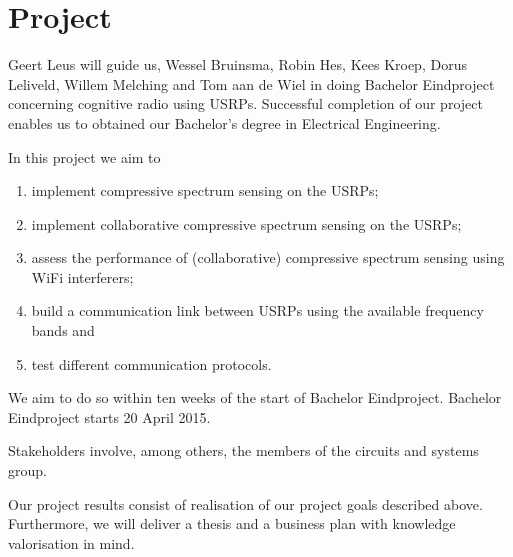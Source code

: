 \documentclass{memoir}
\begin{document}
\chapter{Project}
Geert Leus will guide us, Wessel Bruinsma, Robin Hes, Kees Kroep, Dorus Leliveld, Willem Melching and Tom aan de Wiel in doing Bachelor Eindproject concerning cognitive radio using USRPs. Successful completion of our project enables us to obtained our Bachelor's degree in Electrical Engineering.

In this project we aim to
\begin{enumerate}
    \item implement compressive spectrum sensing on the USRPs;
    \item implement collaborative compressive spectrum sensing on the USRPs;
    \item assess the performance of (collaborative) compressive spectrum sensing using WiFi interferers;
    \item build a communication link between USRPs using the available frequency bands and
    \item test different communication protocols.
\end{enumerate}
We aim to do so within ten weeks of the start of Bachelor Eindproject. Bachelor Eindproject starts 20 April 2015.

Stakeholders involve, among others, the members of the circuits and systems group.

Our project results consist of realisation of our project goals described above. Furthermore, we will deliver a thesis and a business plan with knowledge valorisation in mind.
\end{document}
